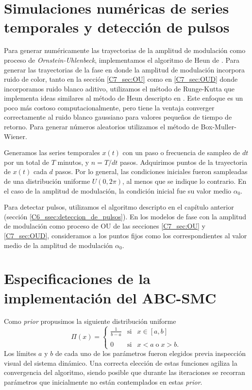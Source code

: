 \documentclass[./main.tex]{subfiles}
\begin{document}
\begin{subappendices}
\section{Simulaciones numéricas de series temporales y detección de pulsos}
\label{C7_ap:OU_OUD_traces}

Para generar numéricamente las trayectorias de la amplitud de modulación como proceso de \textit{Ornstein-Uhlenbeck}, implementamos el algoritmo de Heun de \cite{SanMiguel2000}. Para generar las trayectorias de la fase en donde la amplitud de modulación incorpora ruido de color, tanto en la sección \ref{C7_sec:OU} como en \ref{C7_sec:OUD} donde incorporamos ruido blanco aditivo, utilizamos el método de Runge-Kutta que implementa ideas similares al método de Heun descripto en \cite{SanMiguel2000}. Este enfoque es un poco más costoso computacionalmente, pero tiene la ventaja converger correctamente al ruido blanco gaussiano para valores pequeños de tiempo de retorno. Para generar números aleatorios utilizamos el método de Box-Muller-Wiener. 


Generamos las series temporales $x(t)$ con un paso o frecuencia de sampleo de $dt$ por un total de $T$ minutos, y $n = T/dt $ pasos. Adquirimos puntos de la trayectoria de $x(t)$ cada $d$ pasos. Por lo general, las condiciones iniciales fueron sampleadas de una distribución uniforme $U(0,2\pi)$, al menos que se indique lo contrario. En el caso de la amplitud de modulación, la condición inicial fue su valor medio $\alpha_0$.

Para detectar pulsos, utilizamos el algoritmo descripto en el capítulo anterior (sección \ref{C6_ssec:deteccion_de_pulsos}). En los modelos de fase con la amplitud de modulación como proceso de OU de las secciones \ref{C7_sec:OU} y \ref{C7_sec:OUD}, consideramos a los puntos fijos como los correspondientes al valor medio de la amplitud de modulación $\alpha_0$.



\section{Especificaciones de la implementación del ABC-SMC}
\label{C7_ap:ABC-SMC}

Como \textit{prior} propusimos la siguiente distribución uniforme
\begin{equation*}
    \Pi(x) = \left\{ \begin{array}{lcc}
             \frac{1}{b-a} &   \text{si}  & x \in [a,b] \\
             \\ 0 &  \text{si} & x < a \; \text{o} \; x > b.
             \end{array}
   \right.
\end{equation*}
Los límites $a$ y $b$ de cada uno de los parámetros fueron elegidos previa inspección visual del sistema dinámico. Una correcta elección de estas funciones agiliza la convergencia del algoritmo, siendo posible que durante las iteraciones se recorran parámetros que inicialmente no están contemplados en estas \textit{prior}. 


\end{subappendices}
\end{document}
